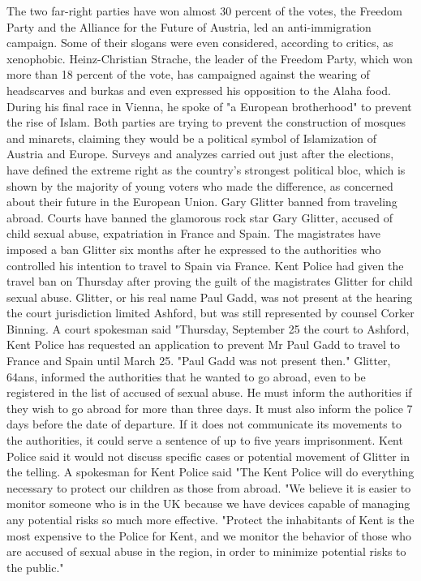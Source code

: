 The two far-right parties have won almost 30 percent of the votes, the Freedom Party and the Alliance for the Future of Austria, led an anti-immigration campaign. Some of their slogans were even considered, according to critics, as xenophobic.
Heinz-Christian Strache, the leader of the Freedom Party, which won more than 18 percent of the vote, has campaigned against the wearing of headscarves and burkas and even expressed his opposition to the Alaha food.
During his final race in Vienna, he spoke of "a European brotherhood" to prevent the rise of Islam.
Both parties are trying to prevent the construction of mosques and minarets, claiming they would be a political symbol of Islamization of Austria and Europe.
Surveys and analyzes carried out just after the elections, have defined the extreme right as the country's strongest political bloc, which is shown by the majority of young voters who made the difference, as concerned about their future in the European Union.
Gary Glitter banned from traveling abroad.
Courts have banned the glamorous rock star Gary Glitter, accused of child sexual abuse, expatriation in France and Spain.
The magistrates have imposed a ban Glitter six months after he expressed to the authorities who controlled his intention to travel to Spain via France.
Kent Police had given the travel ban on Thursday after proving the guilt of the magistrates Glitter for child sexual abuse.
Glitter, or his real name Paul Gadd, was not present at the hearing the court jurisdiction limited Ashford, but was still represented by counsel Corker Binning.
A court spokesman said "Thursday, September 25 the court to Ashford, Kent Police has requested an application to prevent Mr Paul Gadd to travel to France and Spain until March 25.
"Paul Gadd was not present then."
Glitter, 64ans, informed the authorities that he wanted to go abroad, even to be registered in the list of accused of sexual abuse.
He must inform the authorities if they wish to go abroad for more than three days.
It must also inform the police 7 days before the date of departure.
If it does not communicate its movements to the authorities, it could serve a sentence of up to five years imprisonment.
Kent Police said it would not discuss specific cases or potential movement of Glitter in the telling.
A spokesman for Kent Police said "The Kent Police will do everything necessary to protect our children as those from abroad.
"We believe it is easier to monitor someone who is in the UK because we have devices capable of managing any potential risks so much more effective.
"Protect the inhabitants of Kent is the most expensive to the Police for Kent, and we monitor the behavior of those who are accused of sexual abuse in the region, in order to minimize potential risks to the public."
